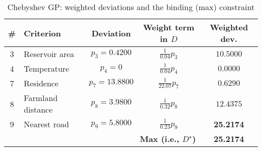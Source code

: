 \begin{table}[htbp]
\centering
\caption{Chebyshev GP: weighted deviations and the binding (max) constraint}
\label{tab:cgpWeightedDeviations}
\begin{tabular}{clccc}
\hline
\textbf{\#} & \textbf{Criterion} & \textbf{Deviation} & \textbf{Weight term in $D$} & \textbf{Weighted dev.} \\
\hline
3  & Reservoir area      & $p_3=0.4200$ & $\frac{1}{0.04}p_3$ & $10.5000$ \\
4  & Temperature         & $p_4=0$      & $\frac{1}{0.04}p_4$ & $0.0000$ \\
7  & Residence           & $p_7=13.8800$& $\frac{1}{22.07}p_7$& $0.6290$ \\
8  & Farmland distance   & $p_8=3.9800$ & $\frac{1}{0.32}p_8$ & $12.4375$ \\
9  & Nearest road        & $p_9=5.8000$ & $\frac{1}{0.23}p_9$ & \textbf{25.2174} \\
\hline
\multicolumn{4}{r}{\textbf{Max (i.e., $D^\star$)}} & \textbf{25.2174} \\
\hline
\end{tabular}
\end{table}
